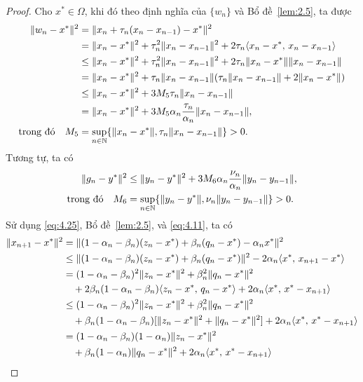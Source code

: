 \documentclass{MyBook}
\theoremstyle{plain}
\theoremstyle{definition}
\theoremstyle{remark}
\numberwithin{equation}{chapter}
\newcommand{\inp}[2]{\langle #1,\,#2\rangle}
\newcommand{\nm}[1]{\lVert #1\rVert}
\newcommand{\N}{\mathbb{N}}
\begin{document}
\begin{proof}
Cho $x^{*}\in\Omega$, khi đó theo định nghĩa của $\{w_n\}$ và Bổ đề~\ref{lem:2.5}, ta được
\begin{align}
\nm{w_n-x^{*}}^2 &= \nm{x_n+\tau_n(x_n-x_{n-1})-x^{*}}^2\notag\\
&= \nm{x_n-x^{*}}^2+\tau_n^2\nm{x_n-x_{n-1}}^2+2\tau_n\inp{x_n-x^{*}}{x_n-x_{n-1}}\notag\\
&\le \nm{x_n-x^{*}}^2+\tau_n^2\nm{x_n-x_{n-1}}^2+2\tau_n\nm{x_n-x^{*}}\nm{x_n-x_{n-1}}\notag\\
&= \nm{x_n-x^{*}}^2+\tau_n\nm{x_n-x_{n-1}}(\tau_n\nm{x_n-x_{n-1}}+2\nm{x_n-x^{*}})\notag\\
&\le \nm{x_n-x^{*}}^2+3M_5\tau_n\nm{x_n-x_{n-1}}\notag\\
&= \nm{x_n-x^{*}}^2+3M_5\alpha_n\frac{\tau_n}{\alpha_n}\nm{x_n-x_{n-1}},\notag\\
\text{trong đó}\quad M_5 &= \sup_{n\in\N}\{\nm{x_n-x^{*}},\tau_n\nm{x_n-x_{n-1}}\}>0. \label{eq:4.25}
\end{align}
Tương tự, ta có
\begin{align}
\nm{g_n-y^{*}}^2 &\le \nm{y_n-y^{*}}^2+3M_6\alpha_n\frac{\nu_n}{\alpha_n}\nm{y_n-y_{n-1}},\notag\\
\text{trong đó}\quad M_6 &= \sup_{n\in\N}\{\nm{y_n-y^{*}},\nu_n\nm{y_n-y_{n-1}}\}>0. \label{eq:4.26}
\end{align}
Sử dụng \eqref{eq:4.25}, Bổ đề~\ref{lem:2.5}, và \eqref{eq:4.11}, ta có
\begin{align}
\nm{x_{n+1}-x^{*}}^2 &= \nm{(1-\alpha_n-\beta_n)(z_n-x^{*})+\beta_n(q_n-x^{*})-\alpha_n x^{*}}^2\notag\\
&\le \nm{(1-\alpha_n-\beta_n)(z_n-x^{*})+\beta_n(q_n-x^{*})}^2-2\alpha_n\inp{x^{*}}{x_{n+1}-x^{*}}\notag\\
&= (1-\alpha_n-\beta_n)^2\nm{z_n-x^{*}}^2+\beta_n^2\nm{q_n-x^{*}}^2\notag\\
&\quad +2\beta_n(1-\alpha_n-\beta_n)\inp{z_n-x^{*}}{q_n-x^{*}}+2\alpha_n\inp{x^{*}}{x^{*}-x_{n+1}}\notag\\
&\le (1-\alpha_n-\beta_n)^2\nm{z_n-x^{*}}^2+\beta_n^2\nm{q_n-x^{*}}^2\notag\\
&\quad +\beta_n(1-\alpha_n-\beta_n)[\nm{z_n-x^{*}}^2+\nm{q_n-x^{*}}^2]+2\alpha_n\inp{x^{*}}{x^{*}-x_{n+1}}\notag\\
&= (1-\alpha_n-\beta_n)(1-\alpha_n)\nm{z_n-x^{*}}^2\notag\\
&\quad +\beta_n(1-\alpha_n)\nm{q_n-x^{*}}^2+2\alpha_n\inp{x^{*}}{x^{*}-x_{n+1}}\notag\\

\end{align}
\end{proof}
\end{document}
